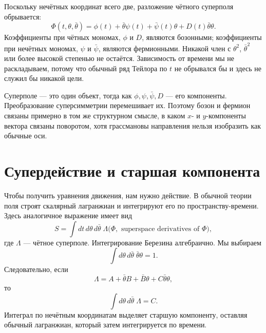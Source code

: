 Поскольку нечётных координат всего две, разложение чётного суперполя обрывается:
\begin{equation}
\Phi(t,\theta,\bar\theta)
=\phi(t)+\bar\theta\psi(t)+\bar\psi(t)\theta
+D(t)\bar\theta\theta.
\label{eq:l7-superfield}
\end{equation}
Коэффициенты при чётных мономах, \(\phi\) и \(D\), являются бозонными; коэффициенты при нечётных мономах, \(\psi\) и \(\bar\psi\), являются фермионными. Никакой член с \(\theta^2\), \(\bar\theta^2\) или более высокой степенью не остаётся. Зависимость от времени мы не раскладываем, потому что обычный ряд Тейлора по \(t\) не обрывался бы и здесь не служил бы никакой цели.

\begin{classroomqa}
\end{classroomqa}

Суперполе — это один объект, тогда как \(\phi,\psi,\bar\psi,D\) — его компоненты. Преобразование суперсимметрии перемешивает их. Поэтому бозон и фермион связаны примерно в том же структурном смысле, в каком \(x\)- и \(y\)-компоненты вектора связаны поворотом, хотя грассмановы направления нельзя изобразить как обычные оси.

\section{Супердействие и старшая компонента}

Чтобы получить уравнения движения, нам нужно действие. В обычной теории поля строят скалярный лагранжиан и интегрируют его по пространству-времени. Здесь аналогичное выражение имеет вид
\begin{equation}
S=\int dt\,d\theta\,d\bar\theta\;\Lambda
\bigl(\Phi,\text{ superspace derivatives of }\Phi\bigr),
\label{eq:l7-superaction}
\end{equation}
где \(\Lambda\) — чётное суперполе. Интегрирование Березина алгебраично. Мы выбираем
\begin{equation}
\int d\theta\,d\bar\theta\;\bar\theta\theta=1.
\end{equation}
Следовательно, если
\begin{equation}
\Lambda=A+\bar\theta B+\bar B\theta+C\bar\theta\theta,
\end{equation}
то
\begin{equation}
\int d\theta\,d\bar\theta\;\Lambda=C.
\label{eq:l7-top-component}
\end{equation}
Интеграл по нечётным координатам выделяет старшую компоненту, оставляя обычный лагранжиан, который затем интегрируется по времени.

